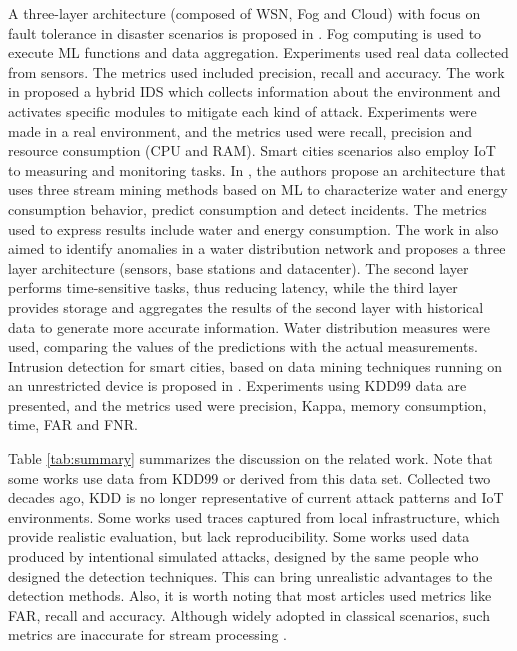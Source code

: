 A three-layer architecture (composed of WSN, Fog and Cloud) with focus on fault
tolerance in disaster scenarios is proposed in \cite{Fault-tolerance-disaster}.
Fog computing is used to execute ML functions and data aggregation. Experiments
used real data collected from sensors. The metrics used included precision,
recall and accuracy.
%
The work in \cite{Kalis} proposed a hybrid IDS which collects information about
the environment and activates specific modules to mitigate each kind of attack.
Experiments were made in a real environment, and the metrics used were recall,
precision and resource consumption (CPU and RAM).
%
Smart cities scenarios also employ IoT to measuring and monitoring tasks.
In \cite{IoT-arch-smartmeter}, the authors propose an architecture that uses
three stream mining methods based on ML to characterize water and energy
consumption behavior, predict consumption and detect incidents.
The metrics used to express results include water and energy consumption.
%
The work in \cite{scalable-anomaly-detection-smart-city} also aimed to identify
anomalies in a water distribution network and proposes a three layer
architecture (sensors, base stations and datacenter).
The second layer performs time-sensitive tasks, thus reducing latency, while the third layer provides storage and aggregates the results of the second layer with
historical data to generate more accurate information.
Water distribution measures were used, comparing the values of the predictions
with the actual measurements.
%
Intrusion detection for smart cities, based on data mining techniques running on
an unrestricted device is proposed in \cite{DS-based-IDS-SmartGrid}.
Experiments using KDD99 data are presented, and the metrics used were precision,
Kappa, memory consumption, time, FAR and FNR.


Table \ref{tab:summary} summarizes the discussion on the related work.
Note that some works use data from KDD99 or derived from this data set.
Collected two decades ago, KDD is no longer representative of current attack
patterns and IoT environments.
Some works used traces captured from local infrastructure, which provide
realistic evaluation, but lack reproducibility.
Some works used data produced by intentional simulated attacks, designed by the
same people who designed the detection techniques.
This can bring unrealistic advantages to the detection methods.
Also, it is worth noting that most articles used metrics like FAR, recall and
accuracy.
Although widely adopted in classical scenarios, such metrics are inaccurate for
stream processing \cite{GAMA2010}.

